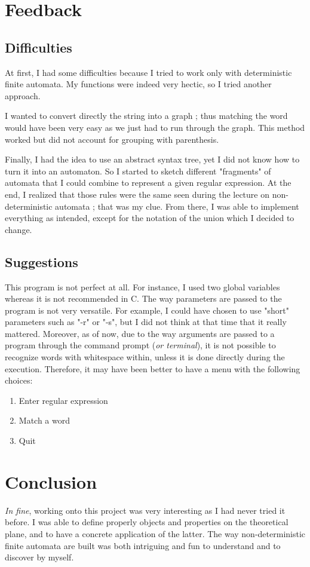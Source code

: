 \documentclass[a4paper,11pt,titlepage]{article}
\begin{document}
\section{Feedback}
\subsection{Difficulties}
At first, I had some difficulties because I tried to work only with deterministic finite automata. My functions were indeed very hectic, so I tried another approach. 

I wanted to convert directly the string into a graph ; thus matching the word would have been very easy as we just had to run through the graph. This method worked but did not account for grouping with parenthesis. 

Finally, I had the idea to use an abstract syntax tree, yet I did not know how to turn it into an automaton. So I started to sketch different "fragments" of automata that I could combine to represent a given regular expression. At the end, I realized that those rules were the same seen during the lecture on non-deterministic automata ; that was my clue. From there, I was able to implement everything as intended, except for the notation of the union which I decided to change.

\subsection{Suggestions}
This program is not perfect at all. For instance, I used two global variables whereas it is not recommended in C. The way parameters are passed to the program is not very versatile. For example, I could have chosen to use "short" parameters such as "-r" or "-s", but I did not think at that time that it really mattered. Moreover, as of now, due to the way arguments are passed to a program through the command prompt (\textit{or terminal}), it is not possible to recognize words with whitespace within, unless it is done directly during the execution. Therefore, it may have been better to have a menu with the following choices: 
\begin{enumerate}
    \item Enter regular expression
    \item Match a word
    \item Quit
\end{enumerate}
\section{Conclusion}
\textit{In fine}, working onto this project was very interesting as I had never tried it before. I was able to define properly objects and properties on the theoretical plane, and to have a concrete application of the latter. The way non-deterministic finite automata are built was both intriguing and fun to understand and to discover by myself.
\end{document}
